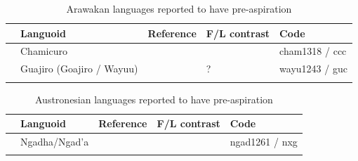 \documentclass[output=paper]{langscibook}
\begin{document}
\begin{paperappendix}
\begin{table}
\begin{tabularx}{\textwidth}{@{}l@{}QQQl}
\lsptoprule
& Languoid & Reference & F/L contrast & Code\\
\midrule
  & Chamicuro & \citet{Silverman2003} &  & cham1318 / ccc\\
& Guajiro (Goajiro / Wayuu) & \citet{Silverman2003} & ? \citep[584]{Silverman2003} & wayu1243 / guc\\
\lspbottomrule
\end{tabularx}
\caption{Arawakan languages reported to have pre-aspiration}
\label{tab:key:3}
\end{table}


\begin{table}
\begin{tabularx}{\textwidth}{@{}l@{}QQQl}
\lsptoprule
& Languoid & Reference & F/L contrast & Code\\
\midrule
&  { {Ngadha/Ngad’a}}        & \citet[114,117]{Djawanai1983} & \citet{Djawanai1983} & ngad1261 / nxg   \\
\lspbottomrule
\end{tabularx}
\caption{Austronesian languages reported to have pre-aspiration}
\label{tab:key:4}
\end{table}



\end{paperappendix}
\end{document}
